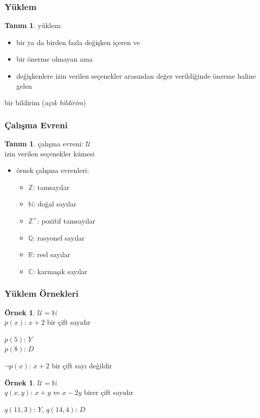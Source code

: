\documentclass[dvipsnames]{beamer}
\theoremstyle{definition}
\newtheorem{tanim}[theorem]{Tanım}
\theoremstyle{example}
\newtheorem{ornek}[theorem]{Örnek}
\theoremstyle{plain}
\begin{document}
\begin{frame}
  \frametitle{Yüklem}

  \begin{tanim}
    \alert{yüklem}:

    \begin{itemize}
      \item bir ya da birden fazla değişken içeren ve
      \item bir önerme olmayan ama
      \item değişkenlere izin verilen seçenekler arasından değer verildiğinde
        önerme haline gelen
    \end{itemize}

    bir bildirim (\emph{açık bildirim})
  \end{tanim}
\end{frame}

\begin{frame}
  \frametitle{Çalışma Evreni}

  \begin{tanim}
    \alert{çalışma evreni}: $\mathcal{U}$\\
    izin verilen seçenekler kümesi
  \end{tanim}

  \pause
  \begin{itemize}
    \item örnek çalışma evrenleri:
    \begin{itemize}
      \item $\mathbb{Z}$: tamsayılar
      \item $\mathbb{N}$: doğal sayılar
      \item $\mathbb{Z}^+$: pozitif tamsayılar
      \item $\mathbb{Q}$: rasyonel sayılar
      \item $\mathbb{R}$: reel sayılar
      \item $\mathbb{C}$: karmaşık sayılar
    \end{itemize}
  \end{itemize}
\end{frame}

\begin{frame}
  \frametitle{Yüklem Örnekleri}

  \begin{ornek}
    $\mathcal{U} = \mathbb{N}$\\
    $p(x)$: $x+2$ bir çift sayıdır

    \bigskip
    $p(5)$: $Y$\\
    $p(8)$: $D$

    \pause
    \bigskip
    $\neg p(x)$: $x+2$ bir çift sayı değildir
  \end{ornek}

  \pause
  \begin{ornek}
    $\mathcal{U} = \mathbb{N}$\\
    $q(x,y)$: $x+y$ ve $x-2y$ birer çift sayıdır

    \bigskip
    $q(11,3)$: $Y$, $q(14,4)$: $D$
  \end{ornek}
\end{frame}
\end{document}

